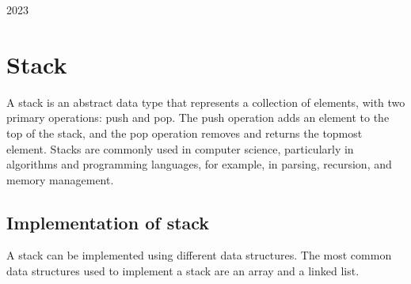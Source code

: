 \documentclass[a4paper, 11pt, oneside]{book} %
\begin{document}
\begin{titlepage}
	\vspace{0.5\baselineskip} %
	
	\vfill %
	
	
	
	
	\vspace{0.3\baselineskip} %
	
	2023 %

\end{titlepage}

\section{Stack}
A stack is an abstract data type that represents a collection of elements, with two primary operations: push and pop. The push operation adds an element to the top of the stack, and the pop operation removes and returns the topmost element. Stacks are commonly used in computer science, particularly in algorithms and programming languages, for example, in parsing, recursion, and memory management.

\subsection{Implementation of stack}
A stack can be implemented using different data structures. The most common data structures used to implement a stack are an array and a linked list.
\end{document}

